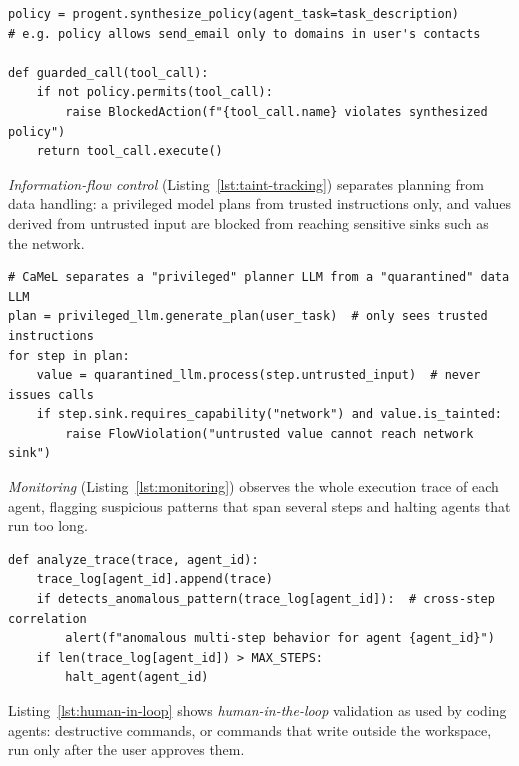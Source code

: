 \begin{lstlisting}[caption={Output guardrails: policy synthesis over tool calls, in the style of Progent~\cite{shi2025progent}.}, label={lst:output-guardrail}]
policy = progent.synthesize_policy(agent_task=task_description)
# e.g. policy allows send_email only to domains in user's contacts

def guarded_call(tool_call):
    if not policy.permits(tool_call):
        raise BlockedAction(f"{tool_call.name} violates synthesized policy")
    return tool_call.execute()
\end{lstlisting}

\emph{Information-flow control} (Listing~\ref{lst:taint-tracking}) separates planning from data handling: a privileged model plans from trusted instructions only, and values derived from untrusted input are blocked from reaching sensitive sinks such as the network.

\begin{lstlisting}[caption={Information-flow control: capability-based dataflow enforcement, in the style of CaMeL~\cite{debenedetti2025camel}.}, label={lst:taint-tracking}]
# CaMeL separates a "privileged" planner LLM from a "quarantined" data LLM
plan = privileged_llm.generate_plan(user_task)  # only sees trusted instructions
for step in plan:
    value = quarantined_llm.process(step.untrusted_input)  # never issues calls
    if step.sink.requires_capability("network") and value.is_tainted:
        raise FlowViolation("untrusted value cannot reach network sink")
\end{lstlisting}

\emph{Monitoring} (Listing~\ref{lst:monitoring}) observes the whole execution trace of each agent, flagging suspicious patterns that span several steps and halting agents that run too long.

\begin{lstlisting}[caption={Monitoring: analyzing multi-agent execution traces for threats invisible at any single step~\cite{kim2026sok}.}, label={lst:monitoring}]
def analyze_trace(trace, agent_id):
    trace_log[agent_id].append(trace)
    if detects_anomalous_pattern(trace_log[agent_id]):  # cross-step correlation
        alert(f"anomalous multi-step behavior for agent {agent_id}")
    if len(trace_log[agent_id]) > MAX_STEPS:
        halt_agent(agent_id)
\end{lstlisting}

Listing~\ref{lst:human-in-loop} shows \emph{human-in-the-loop} validation as used by coding agents: destructive commands, or commands that write outside the workspace, run only after the user approves them.

